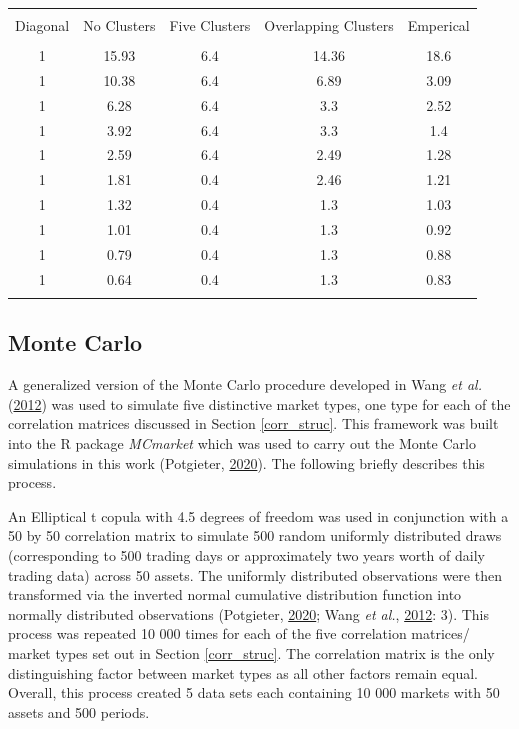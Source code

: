 \documentclass[11pt,preprint, authoryear]{elsarticle}
\let\origtable\table
\let\endorigtable\endtable
\renewenvironment{table}[1][2] {
    \expandafter\origtable\expandafter[H]
} {
    \endorigtable
}
\numberwithin{equation}{section}
\numberwithin{figure}{section}
\numberwithin{table}{section}
\begin{document}
\begin{table}[!htbp] \centering 
  \caption{Eigenvalues} 
  \label{eigens} 
\begin{tabular}{@{\extracolsep{5pt}} ccccc} 
\\[-1.8ex]\hline 
\hline \\[-1.8ex] 
Diagonal & No Clusters & Five Clusters & Overlapping Clusters & Emperical \\ 
\hline \\[-1.8ex] 
1 & 15.93 & 6.4 & 14.36 & 18.6 \\ 
1 & 10.38 & 6.4 & 6.89 & 3.09 \\ 
1 & 6.28 & 6.4 & 3.3 & 2.52 \\ 
1 & 3.92 & 6.4 & 3.3 & 1.4 \\ 
1 & 2.59 & 6.4 & 2.49 & 1.28 \\ 
1 & 1.81 & 0.4 & 2.46 & 1.21 \\ 
1 & 1.32 & 0.4 & 1.3 & 1.03 \\ 
1 & 1.01 & 0.4 & 1.3 & 0.92 \\ 
1 & 0.79 & 0.4 & 1.3 & 0.88 \\ 
1 & 0.64 & 0.4 & 1.3 & 0.83 \\ 
\hline \\[-1.8ex] 
\end{tabular} 
\end{table}

\hypertarget{monte-carlo}{%
\subsection{\texorpdfstring{Monte Carlo
\label{mc}}{Monte Carlo }}\label{monte-carlo}}

A generalized version of the Monte Carlo procedure developed in Wang
\emph{et al.} (\protect\hyperlink{ref-wang2012}{2012}) was used to
simulate five distinctive market types, one type for each of the
correlation matrices discussed in Section \ref{corr_struc}. This
framework was built into the R package \emph{MCmarket} which was used to
carry out the Monte Carlo simulations in this work (Potgieter,
\protect\hyperlink{ref-MCmarket}{2020}). The following briefly describes
this process.

An Elliptical t copula with 4.5 degrees of freedom was used in
conjunction with a 50 by 50 correlation matrix to simulate 500 random
uniformly distributed draws (corresponding to 500 trading days or
approximately two years worth of daily trading data) across 50 assets.
The uniformly distributed observations were then transformed via the
inverted normal cumulative distribution function into normally
distributed observations (Potgieter,
\protect\hyperlink{ref-MCmarket}{2020}; Wang \emph{et al.},
\protect\hyperlink{ref-wang2012}{2012}: 3). This process was repeated 10
000 times for each of the five correlation matrices/ market types set
out in Section \ref{corr_struc}. The correlation matrix is the only
distinguishing factor between market types as all other factors remain
equal. Overall, this process created 5 data sets each containing 10 000
markets with 50 assets and 500 periods.
\end{document}
